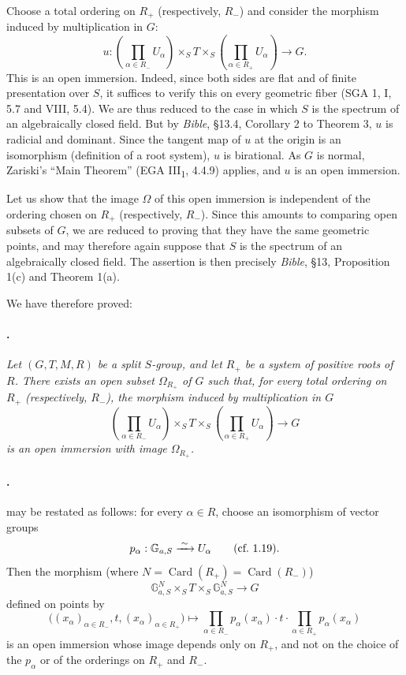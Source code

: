Choose a total ordering on \(R_+\) \textup{(respectively, \(R_-\))}
and consider the morphism induced by multiplication in \(G\):
\[
  u:
  \left(\prod_{\alpha\in R_-}U_\alpha\right)
  \times_S T
  \times_S
  \left(\prod_{\alpha\in R_+}U_\alpha\right)
  \longrightarrow G.
\]
This is an open immersion. Indeed, since both sides are flat and of
finite presentation over \(S\), it suffices to verify this on every
geometric fiber \textup{(SGA 1, I, 5.7 and VIII, 5.4)}. We are thus
reduced to the case in which \(S\) is the spectrum of an
algebraically closed field. But by \emph{Bible}, \S13.4,
Corollary 2 to Theorem 3, \(u\) is radicial and dominant. Since the
tangent map of \(u\) at the origin is an isomorphism
\textup{(definition of a root system)}, \(u\) is birational. As
\(G\) is normal, Zariski's ``Main Theorem''
\textup{(EGA III\textsubscript{1}, 4.4.9)} applies, and \(u\) is an
open immersion.

Let us show that the image \(\Omega\) of this open immersion is
independent of the ordering chosen on \(R_+\)
\textup{(respectively, \(R_-\))}. Since this amounts to comparing
open subsets of \(G\), we are reduced to proving that they have the
same geometric points, and may therefore again suppose that \(S\)
is the spectrum of an algebraically closed field. The assertion is
then precisely \emph{Bible}, \S13, Proposition 1(c) and
Theorem 1(a).

We have therefore proved:

\paragraph{.}
\textit{Let \((G,T,M,R)\) be a split \(S\)-group, and let \(R_+\)
be a system of positive roots of \(R\). There exists an open subset
\(\Omega_{R_+}\) of \(G\) such that, for every total ordering on
\(R_+\) \textup{(respectively, \(R_-\))}, the morphism induced by
multiplication in \(G\)}
\[
  \left(\prod_{\alpha\in R_-}U_\alpha\right)
  \times_S T
  \times_S
  \left(\prod_{\alpha\in R_+}U_\alpha\right)
  \longrightarrow G
\]
\textit{is an open immersion with image \(\Omega_{R_+}\).}

\paragraph{.}
 may be restated as follows: for every
\(\alpha\in R\), choose an isomorphism of vector groups
\[
  p_\alpha:\mathbb G_{a,S}\xrightarrow{\;\sim\;}U_\alpha
  \qquad\textup{(cf.\ 1.19)}.
\]
Then the morphism \textup{(where
\(N=\operatorname{Card}(R_+)=\operatorname{Card}(R_-)\))}
\[
  \mathbb G_{a,S}^{N}
  \times_S T
  \times_S
  \mathbb G_{a,S}^{N}
  \longrightarrow G
\]
defined on points by
\[
  \bigl((x_\alpha)_{\alpha\in R_-},t,
        (x_\alpha)_{\alpha\in R_+}\bigr)
  \longmapsto
  \prod_{\alpha\in R_-}p_\alpha(x_\alpha)\mathbin{\cdot}t
  \mathbin{\cdot}\prod_{\alpha\in R_+}p_\alpha(x_\alpha)
\]
is an open immersion whose image depends only on \(R_+\), and not
on the choice of the \(p_\alpha\) or of the orderings on \(R_+\)
and \(R_-\).

